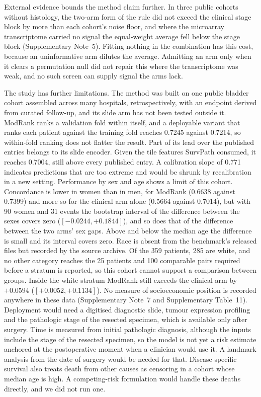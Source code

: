 \documentclass[pdflatex,sn-nature]{sn-jnl}
\begin{document}
External evidence bounds the method claim further. In three public cohorts without histology, the
two-arm form of the rule did not exceed the clinical stage block by more than each cohort's noise
floor, and where the microarray transcriptome carried no signal the equal-weight average fell below
the stage block (Supplementary Note~5). Fitting nothing in the combination has this cost, because an
uninformative arm dilutes the average. Admitting an arm only when it clears a permutation null did
not repair this where the transcriptome was weak, and no such screen can supply signal the arms lack.

The study has further limitations. The method was built on one public bladder cohort assembled
across many hospitals, retrospectively, with an endpoint derived from curated follow-up, and its
slide arm has not been tested outside it.
ModRank ranks a validation fold within itself, and a deployable variant that ranks each patient
against the training fold reaches 0.7245 against 0.7214, so within-fold ranking does not flatter the
result. Part of its lead over the published entries belongs to its slide encoder. Given the tile
features SurvPath consumed, it reaches 0.7004, still above every published entry. A
calibration slope of 0.771 indicates predictions that are too extreme and would be shrunk by
recalibration in a new setting. Performance by sex and age shows a limit of this cohort. Concordance
is lower in women than in men, for ModRank (0.6638 against 0.7399) and more so for the clinical arm
alone (0.5664 against 0.7014), but with 90 women and 31 events the bootstrap interval of the
difference between the sexes covers zero ($[-0.0244, +0.1844]$), and so does that of the difference
between the two arms' sex gaps. Above and below the median age the difference is small and its
interval covers zero. Race is absent from the benchmark's released files but recorded by the source
archive. Of the 359 patients, 285 are white, and no other category reaches the 25 patients and 100
comparable pairs required before a stratum is reported, so this cohort cannot support a comparison
between groups. Inside the white stratum ModRank still exceeds the clinical arm by
$+0.0594$ ($[+0.0052, +0.1134]$). No measure of socioeconomic position is recorded anywhere in these
data (Supplementary Note~7 and Supplementary Table~11).
Deployment would need a digitised diagnostic slide, tumour expression profiling and the pathologic
stage of the resected specimen, which is available only after surgery. Time is measured from initial pathologic diagnosis, although the inputs include
the stage of the resected specimen, so the model is not yet a risk estimate anchored at the
postoperative moment when a clinician would use it. A landmark analysis from the date of surgery would
be needed for that. Disease-specific survival also treats death from other causes as censoring in a
cohort whose median age is high. A competing-risk formulation would handle these deaths directly, and
we did not run one.
\end{document}

